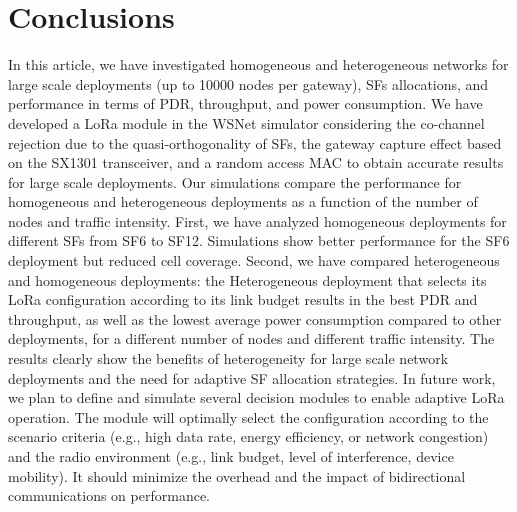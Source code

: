 \section{Conclusions} \label{sec:Conclusions}

In this article,
	we have investigated homogeneous and heterogeneous networks for large scale deployments (up to 10000 nodes per gateway),
	SFs allocations,
	and performance in terms of PDR,
	throughput,
	and power consumption.
We have developed a LoRa module in the WSNet simulator considering the co-channel rejection due to the quasi-orthogonality of SFs,
	the gateway capture effect based on the SX1301 transceiver,
	and a random access MAC to obtain accurate results for large scale deployments.
Our simulations compare the performance for homogeneous and heterogeneous deployments as a function of the number of nodes and traffic intensity.
First,
	we have analyzed homogeneous deployments for different SFs from SF6 to SF12.
Simulations show better performance for the SF6 deployment but reduced cell coverage.
Second,
	we have compared heterogeneous and homogeneous deployments:
	the Heterogeneous deployment that selects its LoRa configuration according to its link budget results in the best PDR and throughput,
	as well as the lowest average power consumption compared to other deployments,
	for a different number of nodes and different traffic intensity.
The results clearly show the benefits of heterogeneity for large scale network deployments and the need for adaptive SF allocation strategies.
In future work,
	we plan to define and simulate several decision modules to enable adaptive LoRa operation.
The module will optimally select the configuration according to the scenario criteria (e.g.,
	high data rate,
	energy efficiency,
	or network congestion) and the radio environment (e.g.,
	link budget,
	level of interference,
	device mobility).
It should minimize the overhead and the impact of bidirectional communications on performance.




